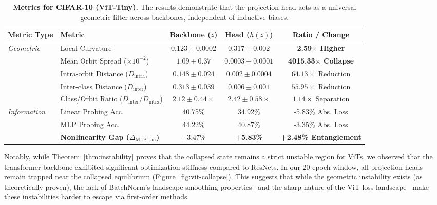 \documentclass{article}
\theoremstyle{plain}
\theoremstyle{definition}
\theoremstyle{remark}
\begin{document}
\begin{table}[ht]
\centering
\scriptsize
\caption{\textbf{Metrics for CIFAR-10 (ViT-Tiny).} The results demonstrate that the projection head acts as a universal geometric filter across backbones, independent of inductive biases.}
\label{tab:vit-unified-results}
\begin{tabular}{@{}llccc@{}}
\toprule
\textbf{Metric Type} & \textbf{Metric} & \textbf{Backbone ($z$)} & \textbf{Head ($h(z)$)} & \textbf{Ratio / Change} \\ 
\midrule
\textit{Geometric} & Local Curvature & $0.123 \pm 0.0002$ & $0.317 \pm 0.002$ & \textbf{2.59$\times$ Higher} \\
      & Mean Orbit Spread ($\times 10^{-2}$) & $1.09 \pm 0.37$ & $0.0003 \pm 0.0001$ & \textbf{4015.33$\times$ Collapse} \\
                   & Intra-orbit Distance ($D_{\text{intra}}$) & $0.148 \pm 0.024$ & $0.002 \pm 0.0004$ & $64.13\times$ Reduction \\
                   & Inter-class Distance ($D_{\text{inter}}$) & $0.313 \pm 0.039$ & $0.006 \pm 0.001$ & $55.95\times$ Reduction \\
                   & Class/Orbit Ratio ($D_{\text{inter}} / D_{\text{intra}}$) & $2.12 \pm 0.44\times$ & $2.42\pm0.58\times$ & $1.14\times$ Separation \\ 
\midrule
\textit{Information} & Linear Probing Acc. & 40.75\% & 34.92\% & -5.83\% Abs. Loss \\
          & MLP Probing Acc. & 44.22\% & 40.87\% & -3.35\% Abs. Loss \\
                     & \textbf{Nonlinearity Gap ($\Delta_{\text{MLP-Lin}}$)} & +3.47\% & \textbf{+5.83\%} & \textbf{+2.48\% Entanglement} \\ 
\bottomrule
\end{tabular}
\end{table}

Notably, while Theorem~\ref{thm:instability} proves that the collapsed state remains a strict unstable region for ViTs, we observed that the transformer backbone exhibited significant optimization stiffness compared to ResNets. In our 20-epoch window, all projection heads remain trapped near the collapsed equilibrium (Figure~\ref{fig:vit-collapse}). This suggests that while the geometric instability exists (as theoretically proven), the lack of BatchNorm's landscape-smoothing properties~\citep{santurkar2019how} and the sharp nature of the ViT loss landscape~\citep{chen2021empirical, chen2022when} make these instabilities harder to escape via first-order methods.
\end{document}
